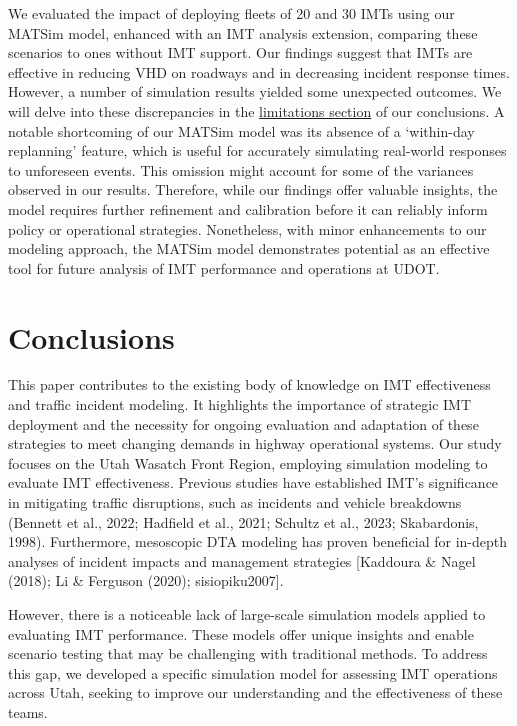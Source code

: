 \documentclass[fancy, oneside, mastersfancy, ms]{byuthesis}
\begin{document}
We evaluated the impact of deploying fleets of 20 and 30 IMTs using our
MATSim model, enhanced with an IMT analysis extension, comparing these
scenarios to ones without IMT support. Our findings suggest that IMTs
are effective in reducing VHD on roadways and in decreasing incident
response times. However, a number of simulation results yielded some
unexpected outcomes. We will delve into these discrepancies in the
\protect\hyperlink{sec-limitations}{limitations section} of our
conclusions. A notable shortcoming of our MATSim model was its absence
of a `within-day replanning' feature, which is useful for accurately
simulating real-world responses to unforeseen events. This omission
might account for some of the variances observed in our results.
Therefore, while our findings offer valuable insights, the model
requires further refinement and calibration before it can reliably
inform policy or operational strategies. Nonetheless, with minor
enhancements to our modeling approach, the MATSim model demonstrates
potential as an effective tool for future analysis of IMT performance
and operations at UDOT.


\hypertarget{sec-conclusions}{%
\chapter{Conclusions}\label{sec-conclusions}}

This paper contributes to the existing body of knowledge on IMT
effectiveness and traffic incident modeling. It highlights the
importance of strategic IMT deployment and the necessity for ongoing
evaluation and adaptation of these strategies to meet changing demands
in highway operational systems. Our study focuses on the Utah Wasatch
Front Region, employing simulation modeling to evaluate IMT
effectiveness. Previous studies have established IMT's significance in
mitigating traffic disruptions, such as incidents and vehicle breakdowns
(Bennett et al., 2022; Hadfield et al., 2021; Schultz et al., 2023;
Skabardonis, 1998). Furthermore, mesoscopic DTA modeling has proven
beneficial for in-depth analyses of incident impacts and management
strategies {[}Kaddoura \& Nagel (2018); Li \& Ferguson (2020);
sisiopiku2007{]}.

However, there is a noticeable lack of large-scale simulation models
applied to evaluating IMT performance. These models offer unique
insights and enable scenario testing that may be challenging with
traditional methods. To address this gap, we developed a specific
simulation model for assessing IMT operations across Utah, seeking to
improve our understanding and the effectiveness of these teams.
\end{document}
